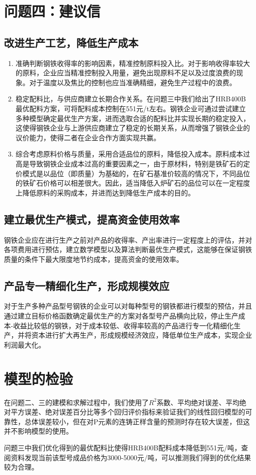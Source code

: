 \documentclass{xcumcmart}
\begin{document}
\section{问题四：建议信}
\subsection{改进生产工艺，降低生产成本}
\begin{enumerate}[(1)]
\item 准确判断钢铁收得率的影响因素，精准控制原料投入比。对于影响收得率较大的原料，企业应当精准控制投入用量，避免出现原料不足以及过度浪费的现象。对于温度以及焦比的控制也应当准确精细，避免生产过程中的浪费。
\item 稳定配料比，与供应商建立长期合作关系。在问题三中我们给出了HRB400B最优配料方案，可将配料成本控制在551元/t左右。钢铁企业可通过尝试建立多种模型确定最优生产方案，进而选取合适的配料比并实现长期的稳定投入，这使得钢铁企业与上游供应商建立了稳定的长期关系，从而增强了钢铁企业的议价能力，使得二者在企业合作方面实现共赢。
\item 综合考虑原料价格与质量，采用合适品位的原料，降低投入成本。原料成本过高是导致钢铁企业成本过高的重要因素之一，由于原材料，特别是铁矿石的定价模式是以品位（即质量）为基础的，在矿石基准价较高的情况下，不同品位的铁矿石价格可以相差很大。因此，适当降低入炉矿石的品位可以在一定程度上降低原料的采购成本，并进而达到降低生产成本的目的。	
\end{enumerate}

\subsection{建立最优生产模式，提高资金使用效率}
钢铁企业应在进行生产之前对产品的收得率、产出率进行一定程度上的评估，并对各项费用进行预估，建立数学模型以及算法判断最优生产模式，这能够在保证钢铁质量的条件下最大限度地节约成本，提高资金的使用效率。
\subsection{产品专一精细化生产，形成规模效应}
对于生产多种产品型号钢铁的企业可以对每种型号的钢铁都进行模型的预估，并且通过建立目标价格函数确定最优生产的方案对各型号产品横向比较，停止生产成本-收益比较低的钢铁，对于成本较低、收得率较高的产品进行专一化精细化生产，并将资本进行扩大再生产，形成规模经济效应，降低单位生产成本，实现企业利润最大化。

\section{模型的检验}
在问题二、三的建模和求解过程中，我们使用了$R^2$系数、平均绝对误差、平均绝对平方误差、绝对误差百分比等多个回归评价指标来验证我们的线性回归模型的可靠性，总体误差较小，但在对P元素的连铸正样含量的预测时存在较大误差，但这并不影响模型的使用。
\par 问题三中我们优化得到的最优配料比使得HRB400B配料成本降低到551元/吨，查阅资料发现当前该型号成品价格为3000-5000元/吨，可以推测我们得到的优化结果较为合理。
\end{document}
